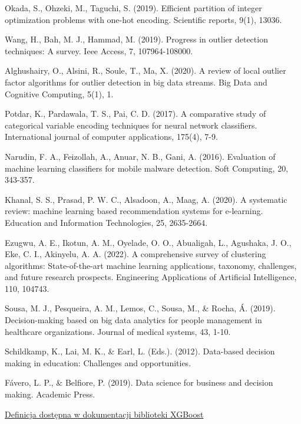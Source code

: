 \documentclass[oneside]{book}
\begin{document}
\begin{thebibliography}{9}
    Okada, S., Ohzeki, M., Taguchi, S. (2019). Efficient partition of integer optimization problems with one-hot encoding. Scientific reports, 9(1), 13036.
    
    Wang, H., Bah, M. J., Hammad, M. (2019). Progress in outlier detection techniques: A survey. Ieee Access, 7, 107964-108000.

    Alghushairy, O., Alsini, R., Soule, T., Ma, X. (2020). A review of local outlier factor algorithms for outlier detection in big data streams. Big Data and Cognitive Computing, 5(1), 1.
    
    Potdar, K., Pardawala, T. S., Pai, C. D. (2017). A comparative study of categorical variable encoding techniques for neural network classifiers. International journal of computer applications, 175(4), 7-9.

    Narudin, F. A., Feizollah, A., Anuar, N. B., Gani, A. (2016). Evaluation of machine learning classifiers for mobile malware detection. Soft Computing, 20, 343-357.
    
    Khanal, S. S., Prasad, P. W. C., Alsadoon, A., Maag, A. (2020). A systematic review: machine learning based recommendation systems for e-learning. Education and Information Technologies, 25, 2635-2664.

    Ezugwu, A. E., Ikotun, A. M., Oyelade, O. O., Abualigah, L., Agushaka, J. O., Eke, C. I.,  Akinyelu, A. A. (2022). A comprehensive survey of clustering algorithms: State-of-the-art machine learning applications, taxonomy, challenges, and future research prospects. Engineering Applications of Artificial Intelligence, 110, 104743.
    
    Sousa, M. J., Pesqueira, A. M., Lemos, C., Sousa, M., \& Rocha, Á. (2019). Decision-making based on big data analytics for people management in healthcare organizations. Journal of medical systems, 43, 1-10.

    Schildkamp, K., Lai, M. K., \& Earl, L. (Eds.). (2012). Data-based decision making in education: Challenges and opportunities.

    Fávero, L. P., \& Belfiore, P. (2019). Data science for business and decision making. Academic Press.

    \href{https://xgboost.readthedocs.io/en/stable/}{Definicja dostępna w dokumentacji biblioteki XGBoost}


\end{thebibliography}
\end{document}
